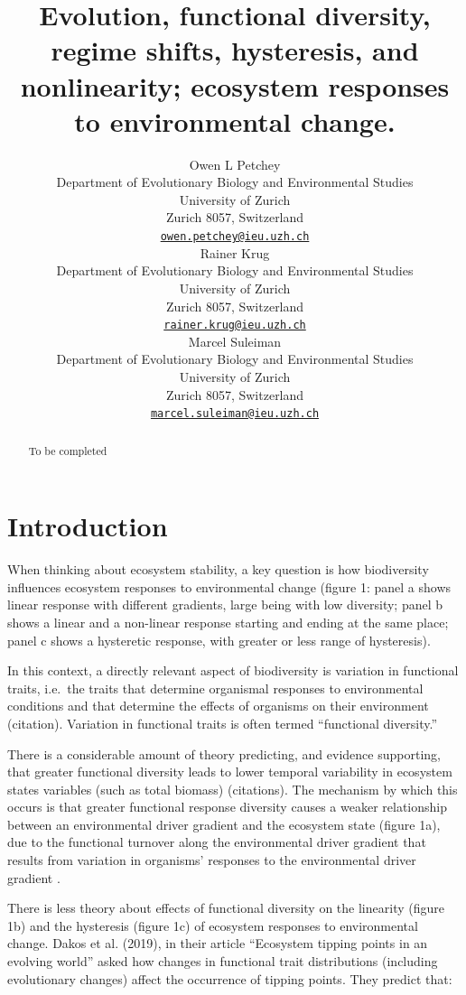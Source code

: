 \documentclass{article}
\title{Evolution, functional diversity, regime shifts, hysteresis, and
nonlinearity; ecosystem responses to environmental change.}
\author{
    Owen L Petchey
   \\
    Department of Evolutionary Biology and Environmental Studies \\
    University of Zurich \\
  Zurich 8057, Switzerland \\
  \texttt{\href{mailto:owen.petchey@ieu.uzh.ch}{\nolinkurl{owen.petchey@ieu.uzh.ch}}} \\
   \And
    Rainer Krug
   \\
    Department of Evolutionary Biology and Environmental Studies \\
    University of Zurich \\
  Zurich 8057, Switzerland \\
  \texttt{\href{mailto:rainer.krug@ieu.uzh.ch}{\nolinkurl{rainer.krug@ieu.uzh.ch}}} \\
   \And
    Marcel Suleiman
   \\
    Department of Evolutionary Biology and Environmental Studies \\
    University of Zurich \\
  Zurich 8057, Switzerland \\
  \texttt{\href{mailto:marcel.suleiman@ieu.uzh.ch}{\nolinkurl{marcel.suleiman@ieu.uzh.ch}}} \\
  }
\begin{document}
\maketitle

\def\tightlist{}


\begin{abstract}
To be completed
\end{abstract}


\hypertarget{introduction}{%
\section{Introduction}\label{introduction}}

When thinking about ecosystem stability, a key question is how
biodiversity influences ecosystem responses to environmental change
(figure 1: panel a shows linear response with different gradients, large
being with low diversity; panel b shows a linear and a non-linear
response starting and ending at the same place; panel c shows a
hysteretic response, with greater or less range of hysteresis).

In this context, a directly relevant aspect of biodiversity is variation
in functional traits, i.e.~the traits that determine organismal
responses to environmental conditions and that determine the effects of
organisms on their environment (citation). Variation in functional
traits is often termed ``functional diversity.''

There is a considerable amount of theory predicting, and evidence
supporting, that greater functional diversity leads to lower temporal
variability in ecosystem states variables (such as total biomass)
(citations). The mechanism by which this occurs is that greater
functional response diversity causes a weaker relationship between an
environmental driver gradient and the ecosystem state (figure 1a), due
to the functional turnover along the environmental driver gradient that
results from variation in organisms' responses to the environmental
driver gradient .

There is less theory about effects of functional diversity on the
linearity (figure 1b) and the hysteresis (figure 1c) of ecosystem
responses to environmental change. Dakos et al. (2019), in their article
``Ecosystem tipping points in an evolving world'' asked how changes in
functional trait distributions (including evolutionary changes) affect
the occurrence of tipping points. They predict that:
\end{document}
